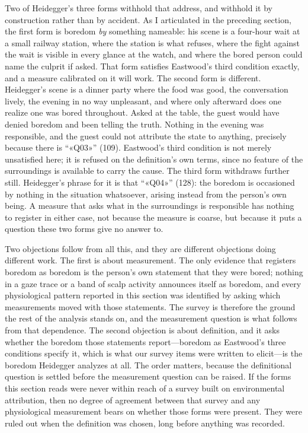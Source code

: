 Two of Heidegger's three forms withhold that address, and withhold it by construction rather
than by accident. As I articulated in the preceding section, the first form is boredom
\textit{by} something nameable: his scene is a four-hour wait at a small railway station, where
the station is what refuses, where the fight against the wait is visible in every glance at the
watch, and where the bored person could name the culprit if asked. That form satisfies
Eastwood's third condition exactly, and a measure calibrated on it will work. The second form
is different. Heidegger's scene is a dinner party where the food was good, the conversation
lively, the evening in no way unpleasant, and where only afterward does one realize one was
bored throughout. Asked at the table, the guest would have denied boredom and been telling the
truth. Nothing in the evening was responsible, and the guest could not attribute the state to
anything, precisely because there is ``«Q03»'' (109). Eastwood's third condition is not merely
unsatisfied here; it is refused on the definition's own terms, since no feature of the
surroundings is available to carry the cause. The third form withdraws further still.
Heidegger's phrase for it is that ``«Q04»'' (128): the boredom is occasioned by nothing in the
situation whatsoever, arising instead from the person's own being. A measure that asks what in
the surroundings is responsible has nothing to register in either case, not because the measure
is coarse, but because it puts a question these two forms give no answer to.

Two objections follow from all this, and they are different objections doing different work.
The first is about measurement. The only evidence that registers boredom as boredom is the
person's own statement that they were bored; nothing in a gaze trace or a band of scalp
activity announces itself as boredom, and every physiological pattern reported in this section
was identified by asking which measurements moved with those statements. The survey is
therefore the ground the rest of the analysis stands on, and the measurement question is what
follows from that dependence. The second objection is about definition, and it asks whether the
boredom those statements report---boredom as Eastwood's three conditions specify it, which is
what our survey items were written to elicit---is the boredom Heidegger analyzes at all. The
order matters, because the definitional question is settled before the measurement question can
be raised. If the forms this section reads were never within reach of a survey built on
environmental attribution, then no degree of agreement between that survey and any physiological
measurement bears on whether those forms were present. They were ruled out when the definition
was chosen, long before anything was recorded.

